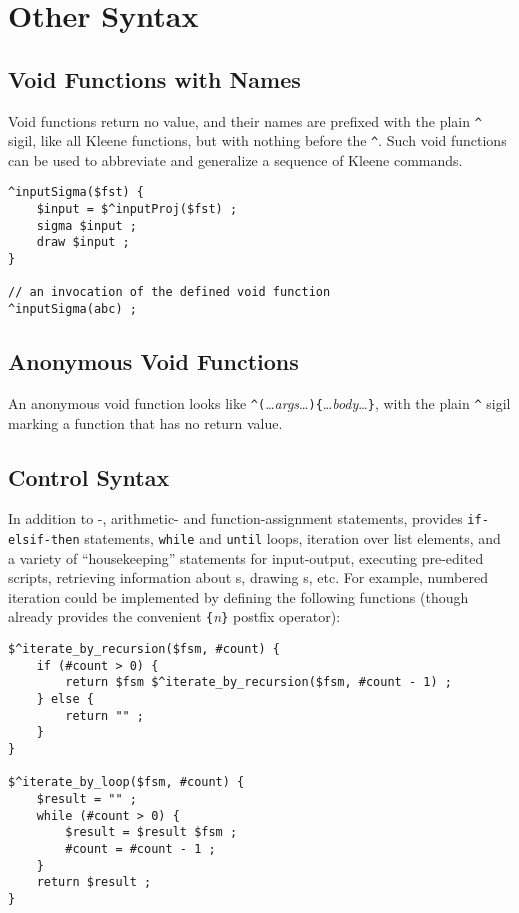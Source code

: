 
\chapter{Other Syntax}

\section{Void Functions with Names}

Void functions return no value, and their names are
prefixed with the plain \verb!^!
sigil, like all Kleene functions, but with nothing before the \verb!^!.
Such void functions can be used to abbreviate and generalize a
sequence of Kleene commands.

\begin{Verbatim}
^inputSigma($fst) {
	$input = $^inputProj($fst) ;
	sigma $input ;
	draw $input ;
}

// an invocation of the defined void function
^inputSigma(abc) ;
\end{Verbatim}

\section{Anonymous Void Functions}

An anonymous void function looks like
\verb!^(!\ldots\emph{args}\ldots\verb!)!\verb!{!\ldots\emph{body}\ldots\verb!}!,
with the plain \verb!^! sigil
marking a function that has no return value. 


\section{Control Syntax}

In addition to \fsm{}-, arithmetic- and function-assignment statements,
\Kleene{} provides \verb!if-elsif-then! statements, \verb!while!  and
\verb!until!  loops, iteration over list elements, and a variety of
``housekeeping'' statements for input-output, executing pre-edited
scripts, retrieving information about \fsm{}s, drawing \fsm{}s, etc.
For example, numbered iteration could be implemented by defining the
following functions (though \Kleene{} already provides the convenient
\verb!{!\emph{n}\verb!}! postfix operator):

\begin{Verbatim}
$^iterate_by_recursion($fsm, #count) {
    if (#count > 0) {
        return $fsm $^iterate_by_recursion($fsm, #count - 1) ;
    } else {
        return "" ;
    }
}

$^iterate_by_loop($fsm, #count) {
    $result = "" ;
    while (#count > 0) {
        $result = $result $fsm ;
        #count = #count - 1 ;
    }
    return $result ;
}
\end{Verbatim}

